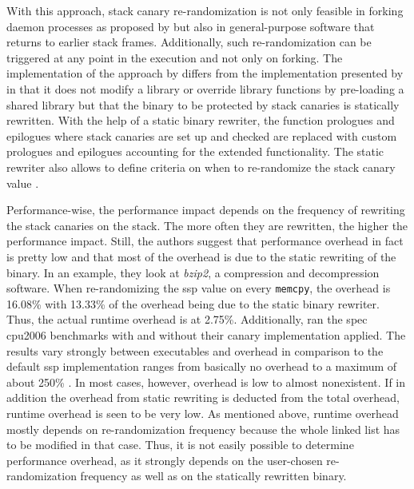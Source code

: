 With this approach, stack canary re-randomization is not only feasible in forking daemon processes as proposed by \citeauthor{MarcoGisbert2013} \cite{MarcoGisbert2013} but also in general-purpose software that returns to earlier stack frames.
Additionally, such re-randomization can be triggered at any point in the execution and not only on forking.
The implementation of the approach by \citeauthor{Hawkins2016} differs from the implementation presented by \citeauthor{MarcoGisbert2013} in that it does not modify a library or override library functions by pre-loading a shared library but that the binary to be protected by stack canaries is statically rewritten.
With the help of a static binary rewriter, the function prologues and epilogues where stack canaries are set up and checked are replaced with custom prologues and epilogues accounting for the extended functionality.
The static rewriter also allows to define criteria on when to re-randomize the stack canary value \cite{Hawkins2016}.

Performance-wise, the performance impact depends on the frequency of rewriting the stack canaries on the stack.
The more often they are rewritten, the higher the performance impact.
Still, the authors suggest that performance overhead in fact is pretty low and that most of the overhead is due to the static rewriting of the binary.
In an example, they look at \emph{bzip2}, a compression and decompression software.
When re-randomizing the \gls{ssp} value on every \texttt{memcpy}, the overhead is 16.08\% with 13.33\% of the overhead being due to the static binary rewriter.
Thus, the actual runtime overhead is at 2.75\%.
Additionally, \citeauthor{Hawkins2016} ran the \gls{spec} \acs{cpu}2006 benchmarks with and without their canary implementation applied.
The results vary strongly between executables and overhead in comparison to the default \gls{ssp} implementation ranges from basically no overhead to a maximum of about 250\% \cite{Hawkins2016}.
In most cases, however, overhead is low to almost nonexistent.
If in addition the overhead from static rewriting is deducted from the total overhead, runtime overhead is seen to be very low.
As mentioned above, runtime overhead mostly depends on re-randomization frequency because the whole linked list has to be modified in that case.
Thus, it is not easily possible to determine performance overhead, as it strongly depends on the user-chosen re-randomization frequency as well as on the statically rewritten binary.


